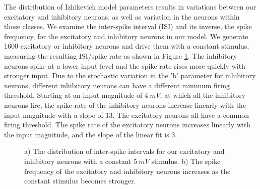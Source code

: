 The distribution of Izhikevich model parameters results in variations between our excitatory and inhibitory neurons, as well as variation in the neurons within those classes.
We examine the inter-spike interval (ISI) and its inverse, the spike frequency, for the excitatory and inhibitory neurons in our model.
We generate 1600 excitatory or inhibitory neurons and drive them with a constant stimulus, measuring the resulting ISI/spike rate as shown in Figure \ref{fig:ISIstatistics}.
The inhibitory neurons spike at a lower input level and the spike rate rises more quickly with stronger input.
Due to the stochastic variation in the 'b' parameter for inhibitory neurons, different inhibitory neurons can have a different minimum firing threshold.
Starting at an input magnitude of $4\ mV$, at which all the inhibitory neurons fire, the spike rate of the inhibitory neurons increase linearly with the input magnitude with a slope of 13.
The excitatory neurons all have a common firing threshold.
The spike rate of the excitatory neurons increases linearly with the input magnitude, and the slope of the linear fit is 3.
\begin{figure}[!htb]
  \caption{a) The distribution of inter-spike intervals for our excitatory and inhibitory neurons with a constant $5\ mV$ stimulus.  
      b) The spike frequency of the excitatory and inhibitory neurons increases as the constant stimulus becomes stronger.}
  \label{fig:ISIstatistics}
\end{figure}
\FloatBarrier

